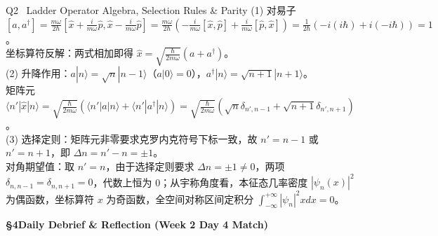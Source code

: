 \documentclass[a4paper,11pt]{article}
\begin{document}
\vspace{1.5pt}

\begin{solution}{Q2 \textperiodcentered\ Ladder Operator Algebra, Selection Rules \& Parity}
\small
(1) 对易子 $[a, a^\dagger] = \frac{m\omega}{2\hbar} [\hat{x} + \frac{i}{m\omega}\hat{p}, \hat{x} - \frac{i}{m\omega}\hat{p}] = \frac{m\omega}{2\hbar} (-\frac{i}{m\omega}[\hat{x},\hat{p}] + \frac{i}{m\omega}[\hat{p},\hat{x}]) = \frac{1}{2\hbar}(-i(i\hbar) + i(-i\hbar)) = 1$。\\
坐标算符反解：两式相加即得 $\hat{x} = \sqrt{\frac{\hbar}{2m\omega}}(a + a^\dagger)$。\\
(2) 升降作用：$a|n\rangle = \sqrt{n}|n-1\rangle$（$a|0\rangle = 0$），$a^\dagger|n\rangle = \sqrt{n+1}|n+1\rangle$。\\
矩阵元 $\langle n'|\hat{x}|n\rangle = \sqrt{\frac{\hbar}{2m\omega}}(\langle n'|a|n\rangle + \langle n'|a^\dagger|n\rangle) = \sqrt{\frac{\hbar}{2m\omega}}(\sqrt{n}\delta_{n', n-1} + \sqrt{n+1}\delta_{n', n+1})$。\\
(3) 选择定则：矩阵元非零要求克罗内克符号下标一致，故 $n' = n-1$ 或 $n' = n+1$，即 $\Delta n = n' - n = \pm 1$。\\
对角期望值：取 $n'=n$，由于选择定则要求 $\Delta n = \pm 1 \neq 0$，两项 $\delta_{n, n-1} = \delta_{n, n+1} = 0$，代数上恒为 0；从宇称角度看，本征态几率密度 $|\psi_n(x)|^2$ 为偶函数，坐标算符 $x$ 为奇函数，全空间对称区间定积分 $\int_{-\infty}^{+\infty} |\psi_n|^2 x dx = 0$。
\end{solution}

\clearpage

{\Large\sffamily\bfseries\color{navy} \S 4\quad Daily Debrief \& Reflection (Week 2 Day 4 Match)}

\vspace{4pt}
\end{document}
